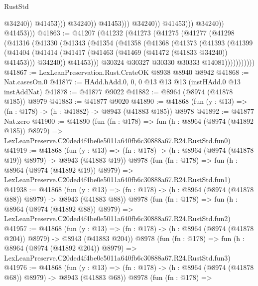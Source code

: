 \begin{lexlean}{RustStd}
\begin{coremodule}
                                            @34240))
                                        @41453)))
                                  @34240))
                              @41453)))
                        @34240))
                    @41453)))
              @34240))
          @41453)))
@41863 := @41207
    (@41232
      (@41273
        (@41275
          (@41277
            (@41298
              (@41316
                (@41330
                  (@41343
                    (@41354
                      (@41358
                        (@41368
                          (@41373
                            (@41393
                              (@41399
                                (@41404
                                  (@41414
                                    (@41417 (@41463 (@41469 (@41472 (@41833 @34240)) @41453)))
                                    @34240))
                                @41453)))
                          @30324
                          @30327
                          @30330
                          @30333
                          @14081)))))))))))
@41867 := LexLeanPreservation.Rust.CrateOK @8938 @8940 @8942
@41868 := Nat.casesOn.{0}
@41877 := HAdd.hAdd.{0, 0, 0} @13 @13 @13 (instHAdd.{0} @13 instAddNat)
@41878 := @41877 @9022
@41882 := @8964 (@8974 (@41878 @185)) @8979
@41883 := @41877 @9020
@41890 := @41868 (fun (y : @13) => (fn : @178) -> (h : @41882) -> @8943 (@41883 @185)) @8978
@41892 := @41877 Nat.zero
@41900 := @41890
    (fun (fn : @178) =>
    fun (h : @8964 (@8974 (@41892 @185)) @8979) =>
    LexLeanPreserve.C20ded4f4be0e5011a640fb6c30888a67.R24.RustStd.fun0)
@41919 := @41868
    (fun (y : @13) => (fn : @178) -> (h : @8964 (@8974 (@41878 @19)) @8979) -> @8943 (@41883 @19))
    @8978
    (fun (fn : @178) =>
    fun (h : @8964 (@8974 (@41892 @19)) @8979) =>
    LexLeanPreserve.C20ded4f4be0e5011a640fb6c30888a67.R24.RustStd.fun1)
@41938 := @41868
    (fun (y : @13) => (fn : @178) -> (h : @8964 (@8974 (@41878 @88)) @8979) -> @8943 (@41883 @88))
    @8978
    (fun (fn : @178) =>
    fun (h : @8964 (@8974 (@41892 @88)) @8979) =>
    LexLeanPreserve.C20ded4f4be0e5011a640fb6c30888a67.R24.RustStd.fun2)
@41957 := @41868
    (fun (y : @13) => (fn : @178) -> (h : @8964 (@8974 (@41878 @204)) @8979) -> @8943 (@41883 @204))
    @8978
    (fun (fn : @178) =>
    fun (h : @8964 (@8974 (@41892 @204)) @8979) =>
    LexLeanPreserve.C20ded4f4be0e5011a640fb6c30888a67.R24.RustStd.fun3)
@41976 := @41868
    (fun (y : @13) => (fn : @178) -> (h : @8964 (@8974 (@41878 @68)) @8979) -> @8943 (@41883 @68))
    @8978
    (fun (fn : @178) =>

\end{coremodule}
\end{lexlean}
